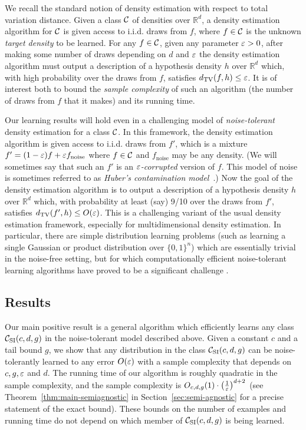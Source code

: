 \medskip

  We recall the standard notion of density estimation with respect to total variation distance.  Given a class $\mathcal{C}$ of densities over $\mathbb{R}^d$, a density estimation algorithm for $\mathcal{C}$ is given access to i.i.d. draws from $f$, where $f \in \mathcal{C}$ is the unknown \emph{target density} to be learned.  For any $f \in \mathcal{C}$, given any parameter $\varepsilon > 0$, after making some number of draws depending on $d$ and $\varepsilon$ the density estimation algorithm must output a description of a hypothesis density $h$ over $\mathbb{R}^d$ which, with high probability over the draws from $f$, satisfies $d_\mathrm{TV}(f,h) \leq \varepsilon$.  It is of interest both to bound the \emph{sample complexity} of such an algorithm (the number of draws from $f$ that it makes) and its running time.

Our learning results will hold even in a challenging model of \emph{noise-tolerant} density estimation for a class $\mathcal{C}$.  In this framework, the density estimation algorithm is given access to i.i.d. draws from $f'$, which is a mixture $f' = (1-\varepsilon)f + \varepsilon f_{\mathrm{noise}}$ where $f \in \mathcal{C}$ and $f_{\mathrm{noise}}$ may be any density. (We will sometimes say that such an $f'$ is an \emph{$\varepsilon$-corrupted} version of $f$. 
This model of noise is sometimes referred to as \emph{Huber's contamination model}~\citep{huber1967behavior}.)  Now the goal of the density estimation algorithm is to output a description of a hypothesis density $h$ over $\mathbb{R}^d$ which, with probability at least (say) 9/10 over the draws from $f'$, satisfies $d_\mathrm{TV}(f',h) \leq O(\varepsilon)$. This is a challenging variant of the usual density estimation framework, especially for multidimensional density estimation.  In particular, there are simple distribution learning problems (such as learning a single Gaussian or product distribution over $\{0,1\}^n$) which are essentially trivial in the noise-free setting, but for which computationally efficient noise-tolerant learning algorithms have proved to be a significant challenge \cite{DKKLMNS16,DKKLMS18, Steinhardt18}.

\subsection{Results}

Our main positive result is a general algorithm which efficiently learns any class ${\mathcal C}_{\mathrm{SI}}(c,d,g)$ in the noise-tolerant model described above.  Given 
a constant $c$ and a tail bound 
$g$, 
we show that any distribution in the class ${\mathcal C}_{\mathrm{SI}}(c,d,g)$ can be noise-tolerantly learned to any error $O(\varepsilon)$ with a sample complexity that depends on $c, g, \varepsilon$ and $d$.   The running time of our algorithm is roughly 
quadratic in the sample complexity, and the sample complexity is 
$O_{c,d,g}(1) \cdot {\left(\frac {1}{\varepsilon}\right)^{d+2}}$
 (see Theorem~\ref{thm:main-semiagnostic} in Section~\ref{sec:semi-agnostic} for a precise statement of the exact bound).
These bounds on the number of examples and running time do not depend on which member of ${\mathcal C}_{\mathrm{SI}}(c,d,g)$ is being learned.


